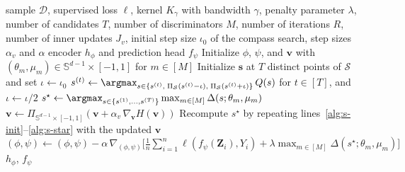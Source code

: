 \documentclass{article} %
\begin{document}
\begin{algorithm}[H]
\caption{supFR}
\label{alg:supipm-frl}
\begin{algorithmic}[1]
\REQUIRE sample $\mathcal{D}$, supervised loss $\ell$, kernel $K_{\gamma}$ with bandwidth $\gamma$, penalty parameter $\lambda$, number of candidates $T$, number of discriminators $M$, number of iterations $R$, number of inner updates $J_v$, initial step size $\iota_0$ of the compass search, step sizes $\alpha_v$ and $\alpha$
\ENSURE encoder $h_{\phi}$ and prediction head $f_{\psi}$
\STATE Initialize $\phi$, $\psi$, and $\mathbf{v}$ with $(\theta_m,\mu_m)\in\mathbb{S}^{d-1}\times[-1,1]$ for $m\in[M]$
    \STATE Initialize $\mathbf{s}$ at $T$ distinct points of $\mathcal{S}$ and set $\iota\leftarrow\iota_0$ \label{alg:s-init}
      \STATE $s^{(t)}\leftarrow\argmax_{s\in\{s^{(t)},\;\Pi_{\mathcal{S}}(s^{(t)}-\iota),\;\Pi_{\mathcal{S}}(s^{(t)}+\iota)\}}\,Q(s)$ for $t\in[T]$, and $\iota\leftarrow\iota/2$
    \ENDWHILE
    \STATE $s^{\star}\leftarrow\argmax_{s\in\{s^{(1)},\ldots,s^{(T)}\}}\max_{m\in[M]}\Delta(s;\theta_m,\mu_m)$ \label{alg:s-star}
    \STATE $\mathbf{v}\leftarrow\Pi_{\mathbb{S}^{d-1}\times[-1,1]}\!\left(\mathbf{v}+\alpha_v\,\nabla_{\mathbf{v}}H(\mathbf{v})\right)$
  \ENDFOR
  \STATE Recompute $s^{\star}$ by repeating lines~\ref{alg:s-init}--\ref{alg:s-star} with the updated $\mathbf{v}$
  \STATE $(\phi,\psi)\leftarrow(\phi,\psi)-\alpha\,\nabla_{(\phi,\psi)}\big[\tfrac{1}{n}\sum_{i=1}^n\ell(f_{\psi}(\mathbf{Z}_i),Y_i)+\lambda\max_{m\in[M]}\Delta(s^{\star};\theta_m,\mu_m)\big]$
  \label{alg:encoder-step}
\ENDFOR
\RETURN $h_{\phi}$, $f_{\psi}$
\end{algorithmic}
\end{algorithm}
\end{document}

